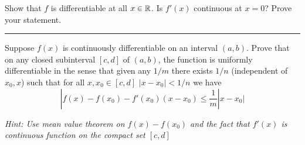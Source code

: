 \documentclass[11pt]{article}
\begin{document}
Show that $f$ is differentiable at all $x \in \mathbb{R}$. Is $f'(x)$ continuous at $x = 0$? Prove your statement.

\hrule








Suppose $f(x)$ is continuously differentiable on an interval $(a,b)$. Prove that on any closed subinterval $[c,d]$ of $(a,b)$, the function is uniformly differentiable in the sense that given any $1/m$ there exists $1/n$ (independent of $x_0, x$) such that for all $x, x_0 \in [c,d]$ $|x - x_0| < 1/n$ we have
$$|f(x) - f(x_0) - f'(x_0)(x-x_0) \leq \frac{1}{m} |x - x_0|$$

\textit{Hint: Use mean value theorem on $f(x) - f(x_0)$ and the fact that $f'(x)$ is continuous function on the compact set $[c,d]$}
\end{document}
